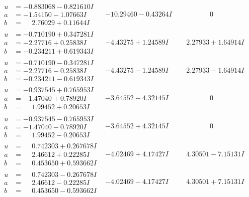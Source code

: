 \documentclass[1p]{elsarticle_modified}
\theoremstyle{definition}
\begin{document}
$$\begin{array}{c|c|c}
\begin{aligned}
u &= -0.883068 - 0.821610 I \\
a &= -1.54150 - 1.07663 I \\
b &= \phantom{-}2.76029 + 0.11644 I\end{aligned}
 & -10.29460 - 0.43264 I & \phantom{-0.000000 } 0 \\ \hline\begin{aligned}
u &= -0.710190 + 0.347281 I \\
a &= -2.27716 + 0.25838 I \\
b &= -0.234211 + 0.619343 I\end{aligned}
 & -4.43275 + 1.24589 I & \phantom{-}2.27933 + 1.64914 I \\ \hline\begin{aligned}
u &= -0.710190 - 0.347281 I \\
a &= -2.27716 - 0.25838 I \\
b &= -0.234211 - 0.619343 I\end{aligned}
 & -4.43275 - 1.24589 I & \phantom{-}2.27933 - 1.64914 I \\ \hline\begin{aligned}
u &= -0.937545 + 0.765953 I \\
a &= -1.47040 + 0.78920 I \\
b &= \phantom{-}1.99452 + 0.20653 I\end{aligned}
 & -3.64552 - 4.32145 I & \phantom{-0.000000 } 0 \\ \hline\begin{aligned}
u &= -0.937545 - 0.765953 I \\
a &= -1.47040 - 0.78920 I \\
b &= \phantom{-}1.99452 - 0.20653 I\end{aligned}
 & -3.64552 + 4.32145 I & \phantom{-0.000000 } 0 \\ \hline\begin{aligned}
u &= \phantom{-}0.742303 + 0.267678 I \\
a &= \phantom{-}2.46612 + 0.22285 I \\
b &= \phantom{-}0.453650 + 0.593662 I\end{aligned}
 & -4.02469 + 4.17427 I & \phantom{-}4.30501 - 7.15131 I \\ \hline\begin{aligned}
u &= \phantom{-}0.742303 - 0.267678 I \\
a &= \phantom{-}2.46612 - 0.22285 I \\
b &= \phantom{-}0.453650 - 0.593662 I\end{aligned}
 & -4.02469 - 4.17427 I & \phantom{-}4.30501 + 7.15131 I\\

\end{array}$$
\end{document}
